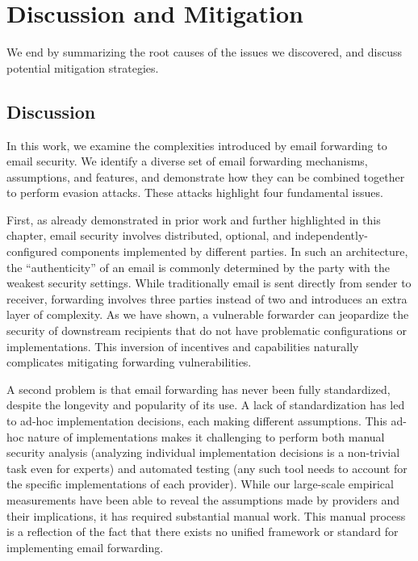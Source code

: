 \section{Discussion and Mitigation}
We end by summarizing the root causes of the issues we discovered, and discuss potential mitigation strategies.

\subsection{Discussion}
In this work, we examine the complexities introduced by email forwarding to email security. We identify a diverse set of email forwarding mechanisms, assumptions, and features, and demonstrate how they can be combined together to perform evasion attacks. These attacks highlight four fundamental issues.

First, as already demonstrated in prior work and further highlighted in this chapter, email security involves distributed, optional, and independently-configured components implemented by different parties. In such an architecture, the
``authenticity'' of an email is commonly determined by the party with the weakest security settings. While traditionally email is sent directly from sender to receiver, forwarding involves three parties instead of two and introduces an extra layer of complexity. As we have shown, a vulnerable forwarder can jeopardize the security of downstream recipients that do not have problematic configurations or implementations. This inversion of
incentives and capabilities naturally complicates
mitigating forwarding vulnerabilities.

A second problem is that email forwarding has never been fully standardized, despite the longevity and popularity of its use. A lack of standardization has led to ad-hoc implementation decisions, each making different assumptions.
This ad-hoc nature of implementations makes it challenging to perform both manual security analysis (analyzing individual implementation decisions is a non-trivial task even for experts) and automated testing (any such tool needs to account for the specific implementations of each provider).
While our large-scale empirical measurements have been able to reveal
the assumptions made by providers and their implications, it has
required substantial manual work.  This manual process is a reflection
of the fact that there exists no unified framework or standard for
implementing email forwarding.


